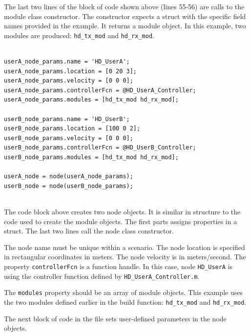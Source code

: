 The last two lines of the block of code shown above (lines 55-56)
are calls to the module class constructor.  The constructor expects
a struct with the specific field names provided in the example.  It
returns a module object.  In this example, two modules are produced:
\verb+hd_tx_mod+ and \verb+hd_rx_mod+.

\begin{lstlisting}[name=hdBuildNodes]
% Define nodes

userA_node_params.name = 'HD_UserA';
userA_node_params.location = [0 20 3];
userA_node_params.velocity = [0 0 0];
userA_node_params.controllerFcn = @HD_UserA_Controller;
userA_node_params.modules = [hd_tx_mod hd_rx_mod];

userB_node_params.name = 'HD_UserB';
userB_node_params.location = [100 0 2];
userB_node_params.velocity = [0 0 0];
userB_node_params.controllerFcn = @HD_UserB_Controller;
userB_node_params.modules = [hd_tx_mod hd_rx_mod];

userA_node = node(userA_node_params);
userB_node = node(userB_node_params);


\end{lstlisting}

The code block above creates two node objects.  It is similar in
structure to the code used to create the module objects. The first
parts assigns properties in a struct.  The last two lines call the
node class constructor.

The node name must be unique within a scenario.  The node location
is specified in rectangular coordinates in meters.  The node
velocity is in meters/second.  The property \verb+controllerFcn+ is
a function handle. In this case, node \verb+HD_UserA+ is using the
controller function defined by \verb+HD_UserA_Controller.m+.

The \verb+modules+ property should be an array of module objects.
This example uses the two modules defined earlier in the build
function: \verb+hd_tx_mod+ and \verb+hd_rx_mod+.

The next block of code in the file sets user-defined parameters in
the node objects.


